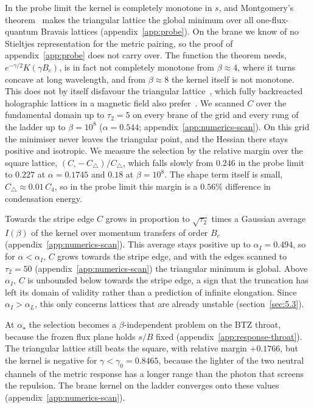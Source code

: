 In the probe limit the kernel is completely monotone in $s$, and
Montgomery's
theorem~\cite{Montgomery:1988mt,Cohn:2007universally,Betermin:2016theta}
makes the triangular lattice the global minimum over all one-flux-quantum
Bravais lattices (appendix~\ref{app:probe}). On the brane we know of no
Stieltjes representation for the metric pairing, so the proof of
appendix~\ref{app:probe} does not carry over. The function the theorem
needs, $e^{-\gamma/2}K(\gamma B_c)$, is in fact not completely monotone from
$\beta \approx 4$, where it turns concave at long wavelength, and from
$\beta \approx 8$ the kernel itself is not monotone. This does not by itself disfavour the triangular
lattice~\cite{Betermin:2016theta,Betermin:2019noncm}, which fully
backreacted holographic lattices in a magnetic field also
prefer~\cite{Donos:2015eew,Donos:2020viz}.
We scanned $C$ over the fundamental domain up to $\tau_2 = 5$ on every
brane of the grid and every rung of the ladder up to $\beta = 10^8$
($\alpha = 0.544$; appendix~\ref{app:numerics-scan}). On this grid the minimiser never leaves the triangular
point, and the Hessian there stays positive and
isotropic. We measure the selection by the relative margin over the square
lattice, $(C_\square - C_\triangle)/C_\triangle$, which falls slowly from
$0.246$ in the probe limit to $0.227$ at $\alpha = 0.1745$ and $0.18$ at
$\beta = 10^8$. The shape term itself is small,
$C_\triangle \approx 0.01\,C_4$, so in the probe limit this margin is a
$0.56\%$ difference in condensation energy.

Towards the stripe edge $C$ grows in proportion to $\sqrt{\tau_2}$ times a
Gaussian average $I(\beta)$ of the kernel over momentum transfers of order
$B_c$ (appendix~\ref{app:numerics-scan}). This average stays
positive up to $\alpha_I = 0.494$, so for $\alpha < \alpha_I$, $C$ grows
towards the stripe edge, and with the edges scanned to $\tau_2 = 50$
(appendix~\ref{app:numerics-scan}) the triangular minimum is global. Above $\alpha_I$,
$C$ is unbounded below towards the stripe edge, a sign that the truncation
has left its domain of validity rather than a prediction of infinite
elongation. Since $\alpha_I > \alpha_L$, this only concerns lattices that
are already unstable (section~\ref{sec:5.3}).

At $\alpha_\star$ the selection becomes a $\beta$-independent problem on the
BTZ throat, because the frozen flux plane holds $s/B$ fixed
(appendix~\ref{app:response-throat}). The triangular lattice
still beats the square, with relative margin $+0.1766$, but the kernel is negative for
$\gamma < \gamma_0 = 0.8465$, because the lighter of the two neutral
channels of the metric response has a longer range than the photon that
screens the repulsion. The brane kernel on the ladder converges onto these
values (appendix~\ref{app:numerics-scan}).

